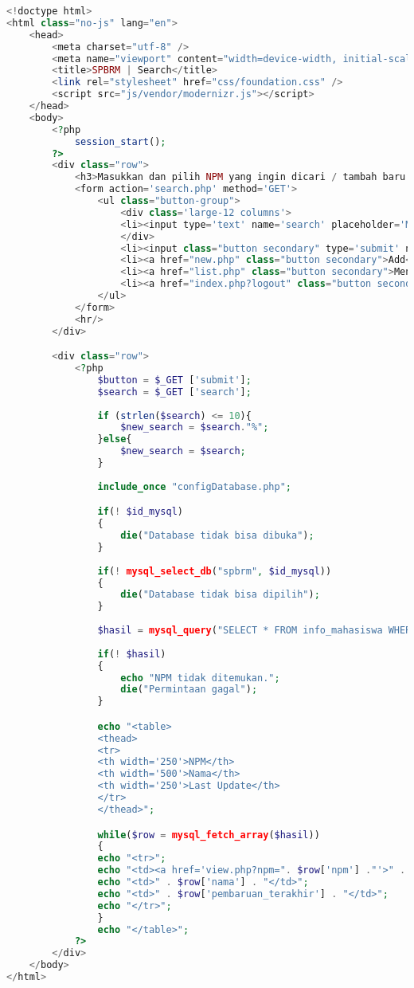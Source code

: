 \begin{lstlisting}[language=php,basicstyle=\tiny,caption=search.php]
<!doctype html>
<html class="no-js" lang="en">
	<head>
		<meta charset="utf-8" />
		<meta name="viewport" content="width=device-width, initial-scale=1.0" />
		<title>SPBRM | Search</title>
		<link rel="stylesheet" href="css/foundation.css" />
		<script src="js/vendor/modernizr.js"></script>
	</head>
	<body>
		<?php
			session_start();
		?>
		<div class="row">
			<h3>Masukkan dan pilih NPM yang ingin dicari / tambah baru.</h3>
			<form action='search.php' method='GET'>
				<ul class="button-group">
					<div class='large-12 columns'>
					<li><input type='text' name='search' placeholder='Masukkan NPM yang ingin dicari'></li>
					</div>
					<li><input class="button secondary" type='submit' name='submit' value='Cari NPM'></li>
					<li><a href="new.php" class="button secondary">Add</a></li>
					<li><a href="list.php" class="button secondary">Menu Utama</a></li>
					<li><a href="index.php?logout" class="button secondary">Logout</a></li>
				</ul>
			</form>
			<hr/>
		</div>

		<div class="row">
			<?php
				$button = $_GET ['submit'];
				$search = $_GET ['search']; 
				
				if (strlen($search) <= 10){
					$new_search = $search."%";
				}else{
					$new_search = $search;
				}
		
				include_once "configDatabase.php";

				if(! $id_mysql)
				{
					die("Database tidak bisa dibuka");
				}
					
				if(! mysql_select_db("spbrm", $id_mysql))
				{
					die("Database tidak bisa dipilih");
				}
			
				$hasil = mysql_query("SELECT * FROM info_mahasiswa WHERE npm LIKE '$new_search'", $id_mysql);
				
				if(! $hasil)
				{
					echo "NPM tidak ditemukan.";
					die("Permintaan gagal");
				}

				echo "<table>
				<thead>
				<tr>
				<th width='250'>NPM</th>
				<th width='500'>Nama</th>
				<th width='250'>Last Update</th>
				</tr>
				</thead>";

				while($row = mysql_fetch_array($hasil))
				{
				echo "<tr>";
				echo "<td><a href='view.php?npm=". $row['npm'] ."'>" . $row['npm'] . "</a></td>";
				echo "<td>" . $row['nama'] . "</td>";
				echo "<td>" . $row['pembaruan_terakhir'] . "</td>";
				echo "</tr>";
				}
				echo "</table>";
			?> 
		</div>
	</body>
</html>
\end{lstlisting}

